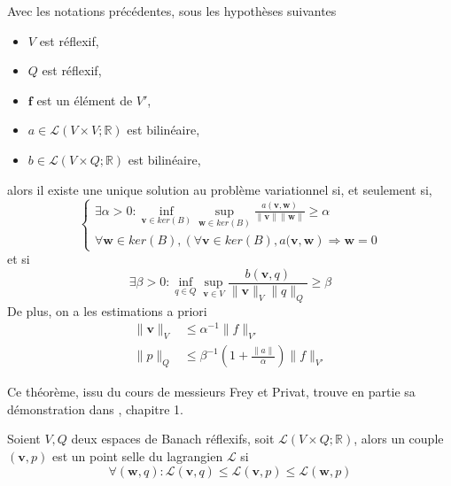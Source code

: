 \begin{theoreme}
    Avec les notations précédentes, sous les hypothèses suivantes
    \begin{itemize}
        \item $V$ est réflexif,
        \item $Q$ est réflexif,
        \item $\mathbf{f}$ est un élément de $V'$,
        \item $a \in \mathcal{L}(V \times V ; \mathbb{R})$ est bilinéaire,
        \item $b \in \mathcal{L}(V \times Q ; \mathbb{R})$ est bilinéaire,
    \end{itemize}
    alors il existe une unique solution au problème variationnel si, et seulement si,
    \begin{equation*}
        \left\{
        \begin{array}{l}
            \exists \alpha > 0 : \inf_{\mathbf{v} \in ker(B)} \sup_{\mathbf{w} \in ker(B)} \frac{a(\mathbf{v}, \mathbf{w})}{\| \mathbf{v} \| \| \mathbf{w} \|} \geqslant \alpha \\
            \forall \mathbf{w} \in ker(B), \left( \forall \mathbf{v} \in ker(B), a(\mathbf{v}, \mathbf{w} \right) \Rightarrow \mathbf{w} = 0
        \end{array}
        \right.
    \end{equation*}
    et si
    \begin{equation*}
        \exists \beta > 0 : \inf_{q\in Q} \sup_{\mathbf{v}\in V} \frac{b(\mathbf{v}, q)}{\|\mathbf{v}\|_V \|q\|_Q} \geqslant \beta
    \end{equation*}
    De plus, on a les estimations a priori
    \begin{align*}
        \|\mathbf{v}\|_V & \leqslant \alpha^{-1} \|f\|_{V'} \\
        \|p\|_Q & \leqslant \beta^{-1} \left( 1 + \frac{\|a\|}{\alpha} \right) \| f \|_{V'}
    \end{align*}
\end{theoreme}

Ce théorème, issu du cours de messieurs Frey et Privat, trouve en partie sa démonstration dans \cite{bernardi}, chapitre 1.

\begin{definition}
    Soient $V, Q$ deux espaces de Banach réflexifs, soit $\mathcal{L}(V\times Q ; \mathbb{R})$, alors un couple $(\mathbf{v}, p)$ est un point selle du lagrangien $\mathcal{L}$ si $$ \forall (\mathbf{w}, q) : \mathcal{L}(\mathbf{v}, q) \leqslant \mathcal{L}(\mathbf{v}, p) \leqslant \mathcal{L}(\mathbf{w}, p) $$
\end{definition}

